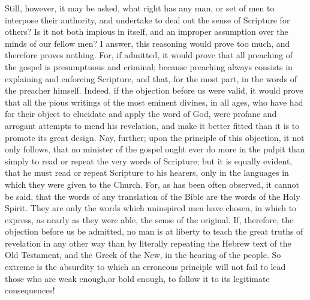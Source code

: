 \documentclass[
]{book}
\begin{document}
Still, however, it may be asked, what right has any man, or set of men to interpose their authority, and undertake to deal out the sense of Scripture for others? Is it not both impious in itself, and an improper assumption over the minds of our fellow men? I answer, this reasoning would prove too much, and therefore proves nothing. For, if admitted, it would prove that all preaching of the gospel is presumptuous and criminal; because preaching always consists in explaining and enforcing Scripture, and that, for the most part, in the words of the preacher himself. Indeed, if the objection before us were valid, it would prove that all the pious writings of the most eminent divines, in all ages, who have had for their object to elucidate and apply the word of God, were profane and arrogant attempts to mend his revelation, and make it better fitted than it is to promote its great design. Nay, further; upon the principle of this objection, it not only follows, that no minister of the gospel ought ever do more in the pulpit than simply to read or repeat the very words of Scripture; but it is equally evident, that he must read or repeat Scripture to his hearers, only in the languages in which they were given to the Church. For, as has been often observed, it cannot be said, that the words of any translation of the Bible are the words of the Holy Spirit. They are only the words which uninspired men have chosen, in which to express, as nearly as they were able, the sense of the original. If, therefore, the objection before us be admitted, no man is at liberty to teach the great truths of revelation in any other way than by literally repeating the Hebrew text of the Old Testament, and the Greek of the New, in the hearing of the people. So extreme is the absurdity to which an erroneous principle will not fail to lead those who are weak enough,or bold enough, to follow it to its legitimate consequences!
\end{document}
